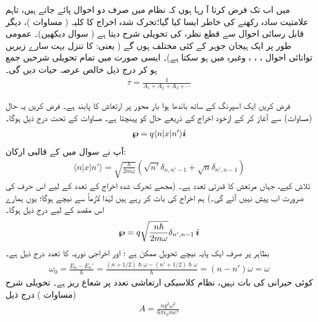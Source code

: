 میں اب تک فرض کرتا آ رہا ہوں کہ نظام میں صرف دو احوال پائے جاتے ہیں، تاہم علامتیت سادہ رکھنے کی خاطر ایسا کیا گیا؛تحرک شدہ اخراج کا کلیہ ( مساوات )، دیگر قابل رسائی احوال سے قطع نظر،  کی تحویلی شرح دیتا ہے ( سوال  دیکھیں)۔ عمومی طور پر ایک ہیجان جوہر کے کئی مختلف  ہوں گے ( یعنی:  کا تنزل بہت سارے زیریں توانائی احوال
 ، ، ، وغیرہ میں ہو سکتا ہے)۔ ایسی صورت میں تمام تحویلی شرحیں جمع ہو کر درج ذیل خالص عرصہ حیات دیں گی۔
\begin{align}
	\tau = \frac{1}{A_1+A_2+A_3+\dotsb}
\end{align}


فرض کریں ایک اسپرنگ کے ساتھ باندھا ہوا بار  محور  پر ارتعاش کا پابند ہے۔ فرض کریں یہ حال  (مساوات) سے آغاز کر کے ازخود اخراج کے ذریعے حال  کو پہنچتا ہے۔ مساوات کے تحت درج ذیل ہوگا۔
\begin{align*}
	{\ensuremath{{\boldsymbol{\wp}}}} = q\langle n|x|n'\rangle{\boldsymbol{i}}
\end{align*}
آپ نے سوال  میں  کے قالبی ارکان:
\begin{align*}
	\langle n|x|n'\rangle = \sqrt{\frac{\hslash}{2m\omega}}(\sqrt{n'}\delta_{n,n'-1}+\sqrt{n}\delta_{n',n-1})
\end{align*}
 تلاش کیے، جہاں مرتعش کا قدرتی تعدد  ہے۔ (مجھے تحرک شدہ اخراج کے تعدد کے لیے اس حرف کی ضرورت اب پیش نہیں آئے گی۔) ہم اخراج کی بات کر رہے ہیں لہٰذا  لازماً  سے نیچے ہوگا؛ یوں ہمارے اس مقصد کے لیے درج ذیل ہوگا۔
\begin{align}
	{\ensuremath{{\boldsymbol{\wp}}}} = q\sqrt{\frac{n\hslash}{2m\omega}}\delta_{n', n-1}\,{\boldsymbol{i}}
\end{align}
بظاہر  پر صرف ایک پایہ نیچے تحویل ممکن ہے ؛ اور اخراجی نوریہ کا تعدد درج ذیل ہے۔
\begin{align}
	\omega_0 = \frac{E_n-E_n'}{\hslash} = \frac{(n+1/2)\hslash\omega - (n'+ 1/2)\hslash\omega}{\hslash} =(n-n')\omega = \omega
\end{align}
کوئی حیرانی کی بات نہیں، نظام کلاسیکی ارتعاشی تعدد پر شعاع ریز ہے۔ تحویلی شرح (مساوات ) درج ذیل
\begin{align}
	A = \frac{nq^2\omega^2}{6\pi\epsilon_0mc^3}
\end{align}
